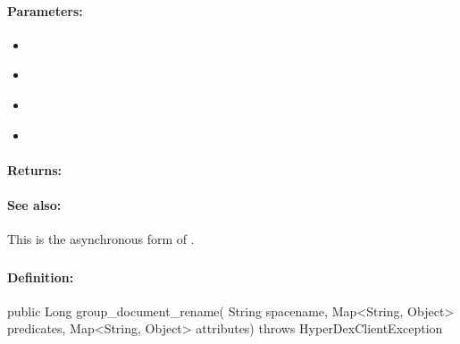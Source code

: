 \paragraph{Parameters:}
\begin{itemize}[noitemsep]
\item {}\\

\item {}\\

\item {}\\

\item {}\\

\end{itemize}

\paragraph{Returns:}


\paragraph{See also:}  This is the asynchronous form of .

\pagebreak
\subsubsection{}
\label{api:java:group_document_rename}


\paragraph{Definition:}
\begin{javacode}
public Long group_document_rename(
        String spacename,
        Map<String, Object> predicates,
        Map<String, Object> attributes) throws HyperDexClientException
\end{javacode}

